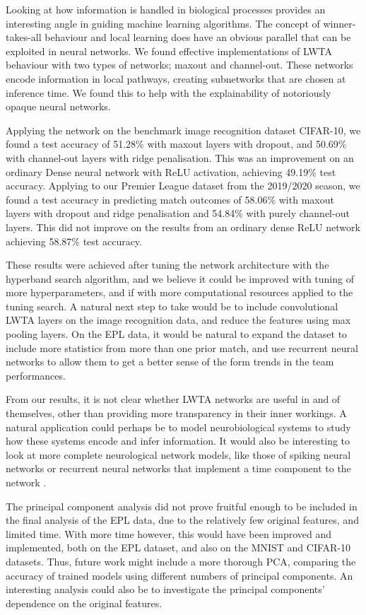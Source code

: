Looking at how information is handled in biological processes provides an interesting angle in guiding machine learning algorithms. The concept of winner-takes-all behaviour and local learning does have an obvious parallel that can be exploited in neural networks. We found effective implementations of LWTA behaviour with two types of networks; maxout and channel-out. These networks encode information in local pathways, creating subnetworks that are chosen at inference time. We found this to help with the explainability of notoriously opaque neural networks.

Applying the network on the benchmark image recognition dataset CIFAR-10, we found a test accuracy of 51.28\% with maxout layers with dropout, and 50.69\% with channel-out layers with ridge penalisation. This was an improvement on an ordinary Dense neural network with ReLU activation, achieving 49.19\% test accuracy. Applying to our Premier League dataset from the 2019/2020 season, we found a test accuracy in predicting match outcomes of 58.06\% with maxout layers with dropout and ridge penalisation and 54.84\% with purely channel-out layers. This did not improve on the results from an ordinary dense ReLU network achieving 58.87\% test accuracy.

These results were achieved after tuning the network architecture with the hyperband search algorithm, and we believe it could be improved with tuning of more hyperparameters, and if with more computational resources applied to the tuning search. A natural next step to take would be to include convolutional LWTA layers on the image recognition data, and reduce the features using max pooling layers. On the EPL data, it would be natural to expand the dataset to include more statistics from more than one prior match, and use recurrent neural networks to allow them to get a better sense of the form trends in the team performances.

From our results, it is not clear whether LWTA networks are useful in and of themselves, other than providing more transparency in their inner workings. A natural application could perhaps be to model neurobiological systems to study how these systems encode and infer information. It would also be interesting to look at more complete neurological network models, like those of spiking neural networks or recurrent neural networks that implement a time component to the network \citep{Chen}.

The principal component analysis did not prove fruitful enough to be included in the final analysis of the EPL data, due to the relatively few original features, and limited time. With more time however, this would have been improved and implemented, both on the EPL dataset, and also on the MNIST and CIFAR-10 datasets. Thus, future work might include a more thorough PCA, comparing the accuracy of trained models using different numbers of principal components. An interesting analysis could also be to investigate the principal components' dependence on the original features. 